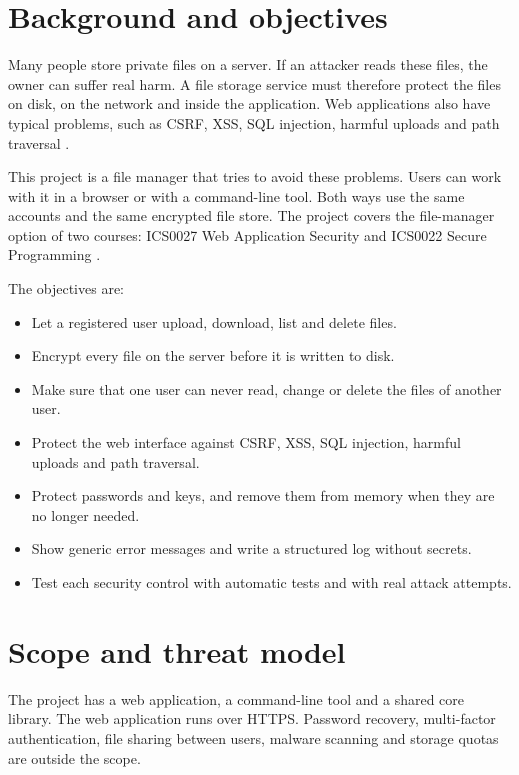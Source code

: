 \section{Background and objectives}

Many people store private files on a server. If an attacker reads these files, the owner can suffer real harm. A file storage service must therefore protect the files on disk, on the network and inside the application. Web applications also have typical problems, such as CSRF, XSS, SQL injection, harmful uploads and path traversal \cite{owasptop10}.

This project is a file manager that tries to avoid these problems. Users can work with it in a browser or with a command-line tool. Both ways use the same accounts and the same encrypted file store. The project covers the file-manager option of two courses: ICS0027 Web Application Security \cite{wasproject} and ICS0022 Secure Programming \cite{spproject}.

The objectives are:

\begin{itemize}
    \item Let a registered user upload, download, list and delete files.
    \item Encrypt every file on the server before it is written to disk.
    \item Make sure that one user can never read, change or delete the files of another user.
    \item Protect the web interface against CSRF, XSS, SQL injection, harmful uploads and path traversal.
    \item Protect passwords and keys, and remove them from memory when they are no longer needed.
    \item Show generic error messages and write a structured log without secrets.
    \item Test each security control with automatic tests and with real attack attempts.
\end{itemize}

\section{Scope and threat model}

The project has a web application, a command-line tool and a shared core library. The web application runs over HTTPS. Password recovery, multi-factor authentication, file sharing between users, malware scanning and storage quotas are outside the scope.

